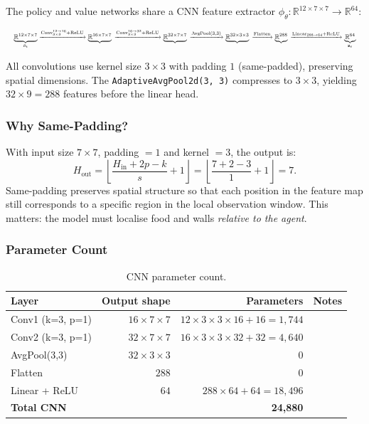 \documentclass[11pt,a4paper]{article}
\newcommand{\R}{\mathbb{R}}
\begin{document}
The policy and value networks share a CNN feature extractor
$\phi_\theta : \R^{12 \times 7 \times 7} \to \R^{64}$:

\begin{equation}
\resizebox{\textwidth}{!}{$
\underbrace{\R^{12 \times 7 \times 7}}_{\bar{o}_t}
\xrightarrow{\text{Conv}_{3\times3}^{12 \to 16} + \text{ReLU}}
\underbrace{\R^{16 \times 7 \times 7}}{}
\xrightarrow{\text{Conv}_{3\times3}^{16 \to 32} + \text{ReLU}}
\underbrace{\R^{32 \times 7 \times 7}}{}
\xrightarrow{\text{AvgPool}(3,3)}
\underbrace{\R^{32 \times 3 \times 3}}{}
\xrightarrow{\text{Flatten}}
\underbrace{\R^{288}}{}
\xrightarrow{\text{Linear}_{288 \to 64} + \text{ReLU}}
\underbrace{\R^{64}}_{\mathbf{z}_t}
$}
\end{equation}

All convolutions use kernel size $3 \times 3$ with padding $1$
(same-padded), preserving spatial dimensions.
The \texttt{AdaptiveAvgPool2d(3, 3)} compresses to $3\times 3$,
yielding $32 \times 9 = 288$ features before the linear head.

\subsubsection{Why Same-Padding?}

With input size $7 \times 7$, padding $= 1$ and kernel $= 3$, the output is:
\begin{equation}
  H_{\text{out}} = \left\lfloor \frac{H_{\text{in}} + 2p - k}{s} + 1 \right\rfloor
  = \left\lfloor \frac{7 + 2 - 3}{1} + 1 \right\rfloor = 7.
\end{equation}
Same-padding preserves spatial structure so that each position in the feature map
still corresponds to a specific region in the local observation window.
This matters: the model must localise food and walls \emph{relative to the agent}.

\subsubsection{Parameter Count}

\begin{table}[h]
\centering
\caption{CNN parameter count.}
\begin{tabular}{@{}lrrr@{}}
\toprule
Layer & Output shape & Parameters & Notes \\
\midrule
Conv1 (k=3, p=1) & $16\times7\times7$ & $12\times3\times3\times16 + 16 = 1{,}744$ & \\
Conv2 (k=3, p=1) & $32\times7\times7$ & $16\times3\times3\times32 + 32 = 4{,}640$ & \\
AvgPool(3,3)     & $32\times3\times3$ & $0$ & \\
Flatten          & $288$              & $0$ & \\
Linear + ReLU    & $64$               & $288\times64 + 64 = 18{,}496$ & \\
\midrule
\textbf{Total CNN} & & \textbf{24,880} & \\
\bottomrule
\end{tabular}
\end{table}
\end{document}
